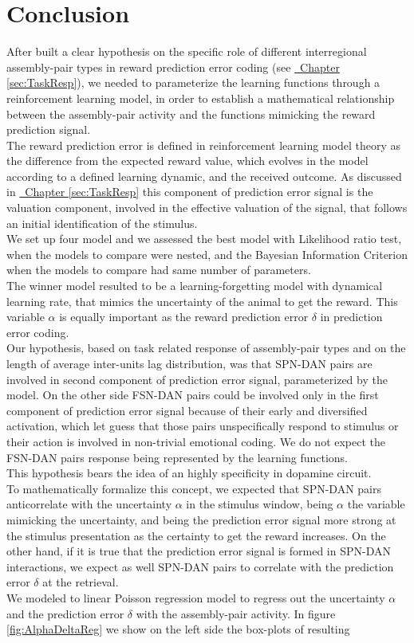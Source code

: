 \section{Conclusion}
\label{sec:concRL}
After built a clear hypothesis on the specific role of different interregional assembly-pair types in reward prediction error coding (see \hyperref[sec:TaskResp]{~Chapter \ref*{sec:TaskResp}}), we needed to parameterize the learning functions through a reinforcement learning model, in order to establish a mathematical relationship between the assembly-pair activity and the functions mimicking the reward prediction signal.\\The reward prediction error is defined in reinforcement learning model theory as the difference from the expected reward value, which evolves in the model according to a defined learning dynamic, and the received outcome. As discussed in \hyperref[sec:TaskResp]{~Chapter \ref*{sec:TaskResp}} this component of prediction error signal is the valuation component, involved in the effective valuation of the signal, that follows an initial identification of the stimulus.\\We set up four model and we assessed the best model with Likelihood ratio test, when the models to compare were nested, and the Bayesian Information Criterion when the models to compare had same number of parameters.\\The winner model resulted to be a learning-forgetting model with dynamical learning rate, that mimics the uncertainty of the animal to get the reward. This variable $\alpha$ is equally important as the reward prediction error $\delta$ in prediction error coding.\\Our hypothesis, based on task related response of assembly-pair types and on the length of average inter-units lag distribution, was that SPN-DAN pairs are involved in second component of prediction error signal, parameterized by the model. On the other side FSN-DAN pairs could be involved only in the first component of prediction error signal because of their early and diversified activation, which let guess that those pairs unspecifically respond to stimulus or their action is involved in non-trivial emotional coding. We do not expect the FSN-DAN pairs response being represented by the learning functions.\\This hypothesis bears the idea of an highly specificity in dopamine circuit.\\To mathematically formalize this concept, we expected that SPN-DAN pairs anticorrelate with the uncertainty $\alpha$ in the stimulus window, being $\alpha$ the variable mimicking the uncertainty, and being the prediction error signal more strong at the stimulus presentation as the certainty to get the reward increases. On the other hand, if it is true that the prediction error signal is formed in SPN-DAN interactions, we expect as well SPN-DAN pairs to correlate with the prediction error $\delta$ at the retrieval.\\We modeled to linear Poisson regression model to regress out the uncertainty $\alpha$ and the prediction error $\delta$ with the assembly-pair activity. In figure \ref{fig:AlphaDeltaReg} we show on the left side the box-plots of resulting 